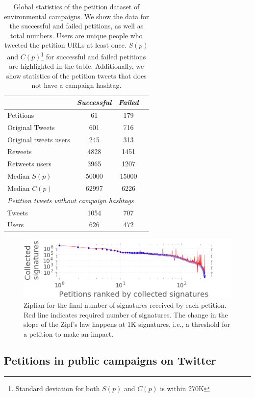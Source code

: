 \begin{table}[hbt!]
\centering
\begin{tabular}{lccc}
			& \textit{Successful} & \textit{Failed}	\\ \midrule
Petitions					& 61		& 179		\\
Original Tweets				& 601		& 716		\\
Original tweets users 		& 245		& 313		\\
Reweets						& 4828		& 1451 		\\
Retweets users				& 3965		& 1207		\\
Median $S(p)$				& 50000		& 15000		\\
Median $C(p)$				& 62997		& 6226		\\
\multicolumn{3}{l}{\textit{Petition tweets without campaign hashtags}}	\\ \midrule
Tweets						& 1054		& 707		\\
Users 						& 626		& 472		\\
\end{tabular}
\caption{Global statistics of the petition dataset of environmental campaigns. We show the data for the successful and failed petitions, as well as total numbers. Users are unique people who tweeted the petition URLs at least once. $S(p)$ and $C(p)$\footnote{Standard deviation for both $S(p)$ and $C(p)$ is within 270K} for successful and failed petitions are highlighted in the table. Additionally, we show statistics of the petition tweets that does not have a campaign hashtag.}
\label{tab:petition_tweets}
\end{table}

\begin{figure}
\centering
\includegraphics[width=\columnwidth]{figures/petitionsVSrank.png}
\caption{Zipfian for the final number of signatures received by each petition. Red line indicates required number of signatures. The change in the slope of the Zipf's law happens at 1K signatures, i.e., a threshold for a petition to make an impact.}
\label{fig:signatures_vs_rank}
\end{figure}

\subsection{Petitions in public campaigns on Twitter}


